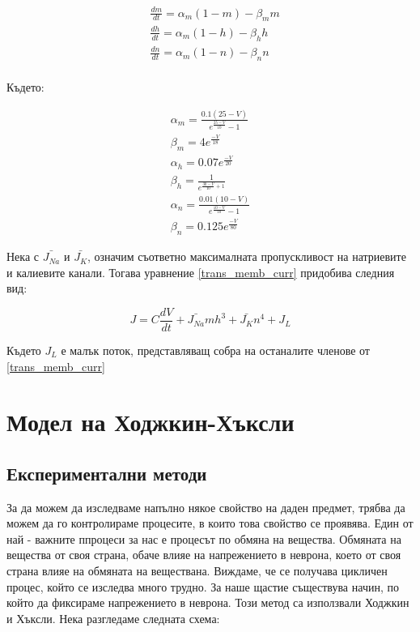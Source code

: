 \documentclass{article}
\numberwithin{equation}{section}
\begin{document}
\begin{equation}\label{chanels}
    \begin{aligned}
        &\frac{dm}{dt} = \alpha_m(1-m) - \beta_mm\\
        &\frac{dh}{dt} = \alpha_m(1-h) - \beta_hh\\
        &\frac{dn}{dt} = \alpha_m(1-n) - \beta_nn\\
    \end{aligned}
\end{equation}

Където:

    \begin{gather*}
        \alpha_m = \frac{0.1\left(25 - V\right)}{e^{\frac{25-V}{10}} - 1}\\
        \beta_m = 4e^{\frac{-V}{18}}\\
        \alpha_h = 0.07e^{\frac{-V}{20}}\\
        \beta_h = \frac{1}{e^{\frac{30-V}{10} + 1}}\\
        \alpha_n = \frac{0.01\left(10 - V\right)}{e^{\frac{10-V}{10}} - 1}\\
        \beta_n = 0.125e^{\frac{-V}{80}}
    \end{gather*}

Нека с $\bar{J_{Na}}$ и $\bar{J_{K}}$, означим съответно максималната пропускливост на натриевите и калиевите канали. Тогава
уравнение \eqref{trans_memb_curr} придобива следния вид:

\begin{equation}\label{trans_memb_curr_h-h}
    J = C\frac{dV}{dt} +\bar{J_{Na}}mh^3 + \bar{J_{K}}n^4 + J_{L}
\end{equation}

Където $J_{L}$ е малък поток, представляващ собра на останалите членове от \eqref{trans_memb_curr}

\section{Модел на Ходжкин-Хъксли}
    \subsection[Експериментални методи]{Експериментални методи}
        За да можем да изследваме напълно някое свойство на даден предмет, трябва да можем да го контролираме процесите, в които това
        свойство се проявява.  Един от най - важните ппроцеси за нас е процесът по обмяна на вещества.  Обмяната на вещества от своя страна,
        обаче влияе на напрежението в неврона, което от своя страна влияе на обмяната на веществана. Виждаме, че се получава цикличен
        процес, който се изследва много трудно. За наше щастие съществува начин, по който да фиксираме напрежението в неврона. Този метод са
        използвали Ходжкин и Хъксли. Нека разгледаме следната схема:
\end{document}
